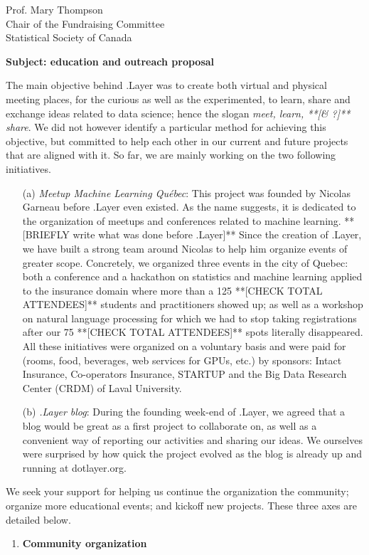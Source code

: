 \documentclass[11pt, a4paper]{letter} %
\begin{document}
\begin{letter}{
	Prof. Mary Thompson\\
	Chair of the Fundraising Committee\\
	Statistical Society of Canada
	
	\bigskip
	\textbf{Subject: education and outreach proposal}%
}
The main objective behind .Layer was to create both virtual and physical meeting places, for the curious as well as the experimented, to learn, share and exchange ideas related to data science; hence the slogan \emph{meet, learn, **[\& ?]** share}. We did not however identify a particular method for achieving this objective, but committed to help each other in our current and future projects that are aligned with it. So far, we are mainly working on the two following initiatives.
\begin{enumerate}
	\item[(a)] \emph{Meetup Machine Learning Québec}: This project was founded by Nicolas Garneau before .Layer even existed. As the name suggests, it is dedicated to the organization of meetups and conferences related to machine learning. **[BRIEFLY write what was done before .Layer]** Since the creation of .Layer, we have built a strong team around Nicolas to help him organize events of greater scope. Concretely, we organized three events in the city of Quebec: both a conference and a hackathon on statistics and machine learning applied to the insurance domain where more than a 125 **[CHECK TOTAL ATTENDEES]** students and practitioners showed up; as well as a workshop on natural language processing for which we had to stop taking registrations after our 75 **[CHECK TOTAL ATTENDEES]** spots literally disappeared. All these initiatives were organized on a voluntary basis and were paid for (rooms, food, beverages, web services for GPUs, etc.) by sponsors: Intact Insurance, Co-operators Insurance, STARTUP and the Big Data Research Center (CRDM) of Laval University.
	\item[(b)] \emph{.Layer blog}: During the founding week-end of .Layer, we agreed that a blog would be great as a first project to collaborate on, as well as a convenient way of reporting our activities and sharing our ideas. We ourselves were surprised by how quick the project evolved as the blog is already up and running at dotlayer.org.
\end{enumerate}

We seek your support for helping us continue the organization the community; organize more educational events; and kickoff new projects. These three axes are detailed below.

\begin{enumerate}
	\item \textbf{Community organization}
	

\end{enumerate}
\end{letter}
\end{document}
